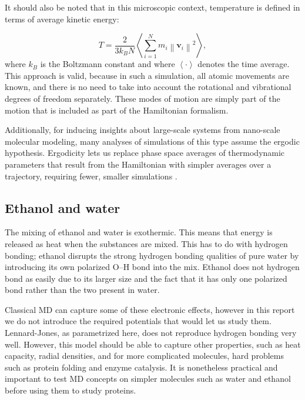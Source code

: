 \documentclass[11pt,a4paper]{article}
\begin{document}
It should also be noted that in this microscopic context, temperature is defined in terms of average kinetic energy:

\begin{equation}
T = %
\frac{2}{3 k_B N} \left\langle \sum_{i=1}^N m_i \left\|\textbf{v}_i\right\|^2 \right\rangle, 
\end{equation}
where $k_B$ is the Boltzmann constant and where $\left\langle \cdot \right\rangle$ denotes the time average. This approach is valid, because in such a simulation, all atomic movements are known, and there is no need to take into account the rotational and vibrational degrees of freedom separately. These modes of motion are simply part of the motion that is included as part of the Hamiltonian formalism. 

Additionally, for inducing insights about large-scale systems from nano-scale molecular modeling, many analyses of simulations of this type assume the ergodic hypothesis. Ergodicity lets us replace phase space averages of thermodynamic parameters that result from the Hamiltonian with simpler averages over a trajectory, requiring fewer, smaller simulations \cite{oliveira2007ergodic}.

\subsection{Ethanol and water}

The mixing of ethanol and water is exothermic. This means that energy is released as heat when the substances are mixed. This has to do with hydrogen bonding; ethanol disrupts the strong hydrogen bonding qualities of pure water by introducing its own polarized O--H bond into the mix. Ethanol does not hydrogen bond as easily due to its larger size and the fact that it has only one polarized bond rather than the two present in water.

Classical MD can capture some of these electronic effects, however in this report we do not introduce the required potentials that would let us study them. Lennard-Jones, as parametrized here, does not reproduce hydrogen bonding very well. However, this model should be able to capture other properties, such as heat capacity, radial densities, and for more complicated molecules, hard problems such as protein folding and enzyme catalysis. It is nonetheless practical and important to test MD concepts on simpler molecules such as water and ethanol before using them to study proteins. 
\end{document}
